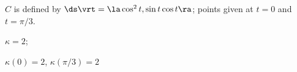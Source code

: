 {$C$ is defined by $\ds \vrt = \la \cos^2 t, \sin t\cos t\ra $; points given at $t=0$ and $t=\pi/3$. 
}
{$\kappa = 2$;

$\kappa(0) = 2$, $\kappa(\pi/3) = 2$
}